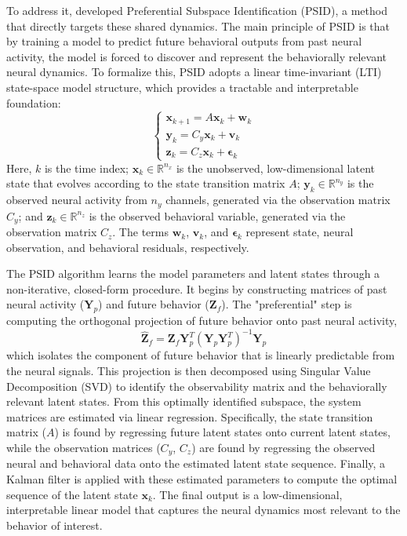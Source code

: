 \documentclass[12pt, a4paper]{article}
\begin{document}
To address it, \textcite{saniModelingBehaviorallyRelevant2021} developed Preferential Subspace Identification (PSID), a method that directly targets these shared dynamics. The main principle of PSID is that by training a model to predict future behavioral outputs from past neural activity, the model is forced to discover and represent the behaviorally relevant neural dynamics. To formalize this, PSID adopts a linear time-invariant (LTI) state-space model structure, which provides a tractable and interpretable foundation:
\[
    \begin{cases}
        \mathbf{x}_{k+1} = A \mathbf{x}_k + \mathbf{w}_k \\
        \mathbf{y}_k = C_y \mathbf{x}_k + \mathbf{v}_k   \\
        \mathbf{z}_k = C_z \mathbf{x}_k + \boldsymbol{\epsilon}_k
    \end{cases}
\]
Here, $k$ is the time index; $\mathbf{x}_k \in \mathbb{R}^{n_x}$ is the unobserved, low-dimensional latent state that evolves according to the state transition matrix $A$; $\mathbf{y}_k \in \mathbb{R}^{n_y}$ is the observed neural activity from $n_y$ channels, generated via the observation matrix $C_y$; and $\mathbf{z}_k \in \mathbb{R}^{n_z}$ is the observed behavioral variable, generated via the observation matrix $C_z$. The terms $\mathbf{w}_k$, $\mathbf{v}_k$, and $\boldsymbol{\epsilon}_k$ represent state, neural observation, and behavioral residuals, respectively.

The PSID algorithm learns the model parameters and latent states through a non-iterative, closed-form procedure. It begins by constructing matrices of past neural activity ($\mathbf{Y}_p$) and future behavior ($\mathbf{Z}_f$). The "preferential" step is computing the orthogonal projection of future behavior onto past neural activity,
\[
    \hat{\mathbf{Z}}_f = \mathbf{Z}_f \mathbf{Y}_p^T (\mathbf{Y}_p \mathbf{Y}_p^T)^{-1} \mathbf{Y}_p
\]
which isolates the component of future behavior that is linearly predictable from the neural signals. This projection is then decomposed using Singular Value Decomposition (SVD) to identify the observability matrix and the behaviorally relevant latent states. From this optimally identified subspace, the system matrices are estimated via linear regression. Specifically, the state transition matrix ($A$) is found by regressing future latent states onto current latent states, while the observation matrices ($C_y$, $C_z$) are found by regressing the observed neural and behavioral data onto the estimated latent state sequence. Finally, a Kalman filter is applied with these estimated parameters to compute the optimal sequence of the latent state $\mathbf{x}_k$. The final output is a low-dimensional, interpretable linear model that captures the neural dynamics most relevant to the behavior of interest.
\end{document}
